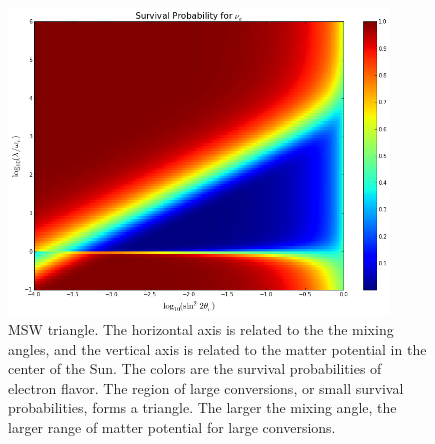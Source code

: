 \begin{figure}[htbp]
    \centering
    \includegraphics[width=0.9\textwidth]{chapters/assets/basics/msw-triangle.png}
    \caption{MSW triangle. The horizontal axis is related to the the mixing angles, and the vertical axis is related to the matter potential in the center of the Sun. The colors are the survival probabilities of electron flavor. The region of large conversions, or small survival probabilities, forms a triangle. The larger the mixing angle, the larger range of matter potential for large conversions.}
    \label{chap:basics-sec:msw-fig:msw-triangle}
\end{figure}








